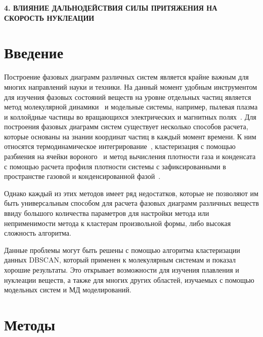 
\begin{center}
\textbf{\large 4. ВЛИЯНИЕ ДАЛЬНОДЕЙСТВИЯ СИЛЫ ПРИТЯЖЕНИЯ НА СКОРОСТЬ НУКЛЕАЦИИ}
\end{center}


\section{Введение}
\label{PRIMe-SecIntroduction}

Построение фазовых диаграмм различных систем является крайне важным для многих направлений науки и техники.
На данный момент удобным инструментом для изучения фазовых состояний веществ на уровне отдельных частиц является метод молекулярной динамики~\cite{10.1063/1.1730376, 10.1006/jcph.1995.1039} и модельные системы, например, пылевая плазма и коллойдные частицы во вращающихся электрических и магнитных полях~\cite{10.1038/s41598-017-14001-y, 10.1103/physreve.103.022608, 10.1103/physreve.96.043201}.
Для построения фазовых диаграмм систем существует несколько способов расчета, которые основаны на знании координат частиц в каждый момент времени.
К ним относятся термодинамическое интегрирование~\cite{10.1088/0953-8984/21/46/465104}, кластеризация с помощью разбиения на ячейки вороного~\cite{10.1021/acs.jpcc.7b09317} и метод вычисления плотности газа и конденсата с помощью расчета профиля плотности системы с зафиксированными в пространстве газовой и конденсированной фазой~\cite{10.1021/jp806127j, 10.1021/jp1117213}.

Однако каждый из этих методов имеет ряд недостатков, которые не позволяют им быть универсальным способом для расчета фазовых диаграмм различных веществ ввиду большого количества параметров для настройки метода или неприменимости метода к кластерам произвольной формы, либо высокая сложность алгоритма.

Данные проблемы могут быть решены с помощью алгоритма кластеризации данных DBSCAN, который применен к молекулярным системам и показал хорошие результаты.
Это открывает возможности для изучения плавления и нуклеации веществ, а также для многих других областей, изучаемых с помощью модельных систем и МД моделирований.


\section{Методы}
\label{PRIMe-SecMethods}

